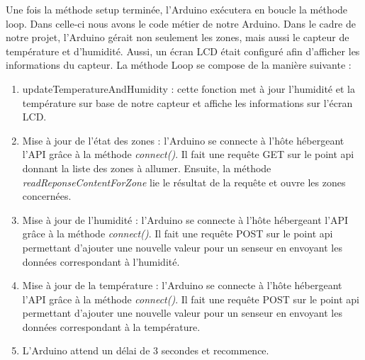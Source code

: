 Une fois la méthode setup terminée, l’Arduino exécutera en boucle la méthode loop. Dans celle-ci nous avons le code métier de notre Arduino. Dans le cadre de notre projet, l’Arduino gérait non seulement les zones, mais aussi le capteur de température et d’humidité. Aussi, un écran LCD était configuré afin d’afficher les informations du capteur. La méthode Loop se compose de la manière suivante :
\begin{enumerate}
\item updateTemperatureAndHumidity : cette fonction met à jour l’humidité et la température sur base de notre capteur et affiche les informations sur l’écran LCD.
\item Mise à jour de l’état des zones : l’Arduino se connecte à l’hôte hébergeant l’API grâce à la méthode \emph{connect()}. Il fait une requête GET sur le point api donnant la liste des zones à allumer. Ensuite, la méthode \emph{readReponseContentForZone} lie le résultat de la requête et ouvre les zones concernées.
\item Mise à jour de l’humidité : l’Arduino se connecte à l’hôte hébergeant l’API grâce à la méthode \emph{connect()}. Il fait une requête POST sur le point api permettant d’ajouter une nouvelle valeur pour un senseur en envoyant les données correspondant à l’humidité.
\item Mise à jour de la température : l’Arduino se connecte à l’hôte hébergeant l’API grâce à la méthode \emph{connect()}. Il fait une requête POST sur le point api permettant d’ajouter une nouvelle valeur pour un senseur en envoyant les données correspondant à la température.
\item L’Arduino attend un délai de 3 secondes et recommence.
\end{enumerate}

